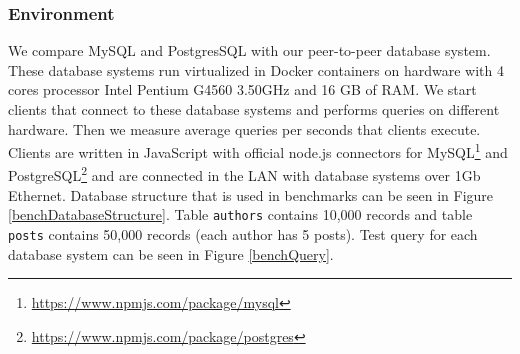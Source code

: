 \subsubsection{Environment}
We compare MySQL and PostgresSQL with our peer-to-peer database system. These database systems run virtualized in Docker containers on hardware with 4 cores processor Intel Pentium G4560 3.50GHz and 16 GB of RAM.  We start clients that connect to these database systems and performs queries on different hardware. Then we measure average queries per seconds that clients execute. Clients are written in JavaScript with official node.js connectors for MySQL\footnote{\url{https://www.npmjs.com/package/mysql}} and PostgreSQL\footnote{\url{https://www.npmjs.com/package/postgres}} and are connected in the LAN with database systems over 1Gb Ethernet. Database structure that is used in benchmarks can be seen in Figure \ref{benchDatabaseStructure}. Table \texttt{authors} contains 10,000 records and table \texttt{posts} contains 50,000 records (each author has 5 posts). Test query for each database system can be seen in Figure \ref{benchQuery}.

